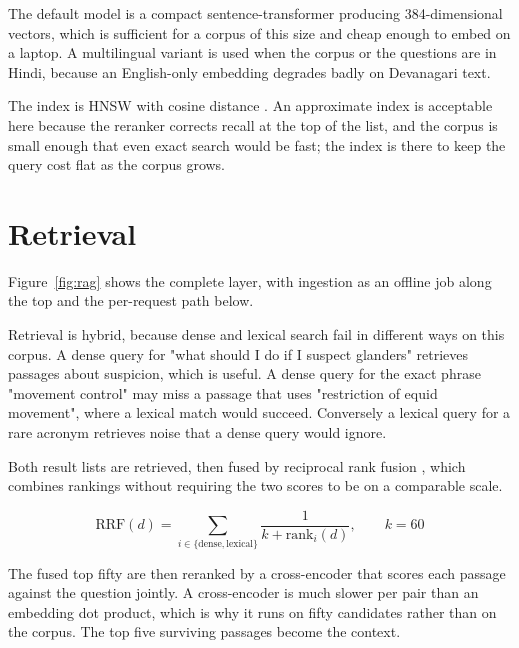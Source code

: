 \documentclass[10pt,openany]{report}
\begin{document}
The default model is a compact sentence-transformer \cite{reimers2019} producing
384-dimensional vectors, which is
sufficient for a corpus of this size and cheap enough to embed on a laptop. A multilingual variant
is used when the corpus or the questions are in Hindi, because an English-only embedding degrades
badly on Devanagari text.

The index is HNSW with cosine distance \cite{malkov2020}. An approximate index is acceptable here because the
reranker corrects recall at the top of the list, and the corpus is small enough that even exact
search would be fast; the index is there to keep the query cost flat as the corpus grows.

\section{Retrieval}

Figure~\ref{fig:rag} shows the complete layer, with ingestion as an offline job along the top and
the per-request path below.



Retrieval is hybrid, because dense and lexical search \cite{robertson2009} fail in different ways
on this corpus. A
dense query for "what should I do if I suspect glanders" retrieves passages about suspicion, which
is useful. A dense query for the exact phrase "movement control" may miss a passage that uses
"restriction of equid movement", where a lexical match would succeed. Conversely a lexical query
for a rare acronym retrieves noise that a dense query would ignore.

Both result lists are retrieved, then fused by reciprocal rank fusion \cite{cormack2009}, which
combines rankings without requiring the two scores to be on a comparable scale.

\[
\mathrm{RRF}(d) = \sum_{i \in \{\text{dense},\text{lexical}\}} \frac{1}{k + \mathrm{rank}_i(d)},
\qquad k = 60
\]

The fused top fifty are then reranked by a cross-encoder that scores each passage against the
question jointly. A cross-encoder is much slower per pair than an embedding dot product, which is
why it runs on fifty candidates rather than on the corpus. The top five surviving passages become
the context.
\end{document}
